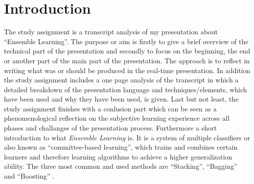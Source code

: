 \chapter{Introduction}

The study assignment is a transcript analysis of my presentation about \enquote{Ensemble Learning}. The purpose or aim is firstly to give a brief overview of the technical part of the presentation and secondly to focus on the beginning, the end or another part of the main part of the presentation. The approach is to reflect in writing what was or should be produced in the real-time presentation. In addition the study assignment includes a one page analysis of the transcript in which a detailed breakdown of the presentation language and techniques/elements, which have been used and why they have been used, is given. Last but not least, the study assignment finishes with a conlusion part which can be seen as a phenomenological reflection on the subjective learning experience across all phases and challanges of the presentation process. Furthermore a short introduction to what \textit{Ensemble Learning} is. It is a system of multiple classifiers or also known as \enquote{committee-based learning}, which trains and combines certain learners and therefore learning algorithms to achieve a higher generalization ability. The three most common and used methods are \enquote{Stacking}, \enquote{Bagging} and \enquote{Boosting} \autocite[]{Zhou.2021} \autocite[]{Zhou.2012}.